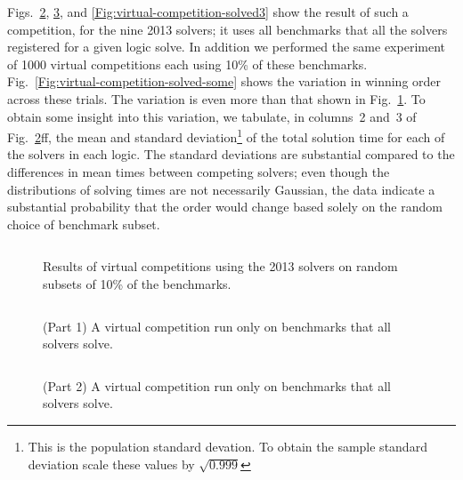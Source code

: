 \documentclass{eptcs}
\begin{document}
Figs.~\ref{Fig:virtual-competition-solved}, \ref{Fig:virtual-competition-solved2}, and \ref{Fig:virtual-competition-solved3} show the result of such a competition, for the nine 2013 solvers; it uses all benchmarks that all the solvers registered for a given logic solve. In addition we performed the same experiment of 1000 virtual competitions each using 10\% of these benchmarks.  Fig.~\ref{Fig:virtual-competition-solved-some} shows the variation in winning order across these trials. The variation is even more than that shown in Fig.~\ref{Fig:virtual-competition-some}. To obtain some insight into this variation, we tabulate, in columns~2 and~3 of Fig.~\ref{Fig:virtual-competition-solved}ff, the mean and standard deviation\footnote{This is the population standard devation. To obtain the sample standard deviation scale these values by $\sqrt{0.999}$ } of the total solution time for each of the solvers in each logic. The standard deviations are substantial compared to the differences in mean times between competing solvers; even though the distributions of solving times are not necessarily Gaussian, the data indicate a substantial probability that the order would change based solely on the random choice of benchmark subset.

\begin{figure}
\centering
\begin{tabular}{|lrr|rr|r|}
\hline

\end{tabular}
\caption{Results of virtual competitions using the 2013 solvers on random subsets of 10\% of the benchmarks.}
\label{Fig:virtual-competition-some}
\end{figure}

\begin{figure}
\centering
\begin{tabular}{|p{.01in}rrrl|}
\hline

\end{tabular}
\caption{(Part 1) A virtual competition run only on benchmarks that all solvers solve.}
\label{Fig:virtual-competition-solved}
\end{figure}

\begin{figure}
\centering
\begin{tabular}{|p{.01in}rrrl|}
\hline

\end{tabular}
\caption{(Part 2) A virtual competition run only on benchmarks that all solvers solve.}
\label{Fig:virtual-competition-solved2}
\end{figure}
\end{document}
